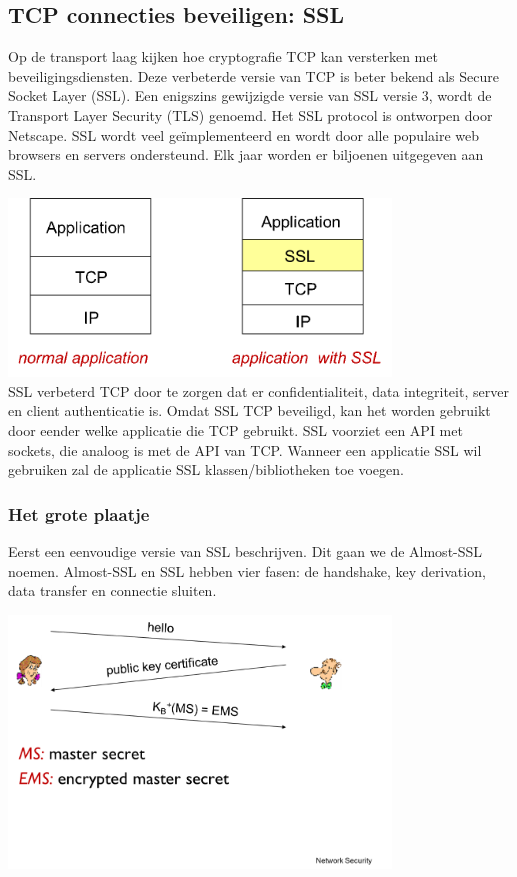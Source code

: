 \subsection{TCP connecties beveiligen: SSL}

Op de transport laag kijken hoe cryptografie TCP kan versterken met beveiligingsdiensten. Deze verbeterde versie van TCP is beter bekend als Secure Socket Layer (SSL). Een enigszins gewijzigde versie van SSL versie 3, wordt de Transport Layer Security (TLS) genoemd.
Het SSL protocol is ontworpen door Netscape. SSL wordt veel geïmplementeerd en wordt door alle populaire web browsers en servers ondersteund. Elk jaar worden er biljoenen uitgegeven aan SSL.

\includegraphics[width=4in]{./img/imghfdst8/hfdst8puntje27.png}\\[1cm]
 

SSL verbeterd TCP door te zorgen dat er confidentialiteit, data integriteit, server en client authenticatie is. Omdat SSL TCP beveiligd, kan het worden gebruikt door eender welke applicatie die TCP gebruikt. SSL voorziet een API met sockets, die analoog is met de API van TCP. Wanneer een applicatie SSL wil gebruiken zal de applicatie SSL klassen/bibliotheken toe voegen.

\subsubsection{Het grote plaatje}

Eerst een eenvoudige versie van SSL beschrijven. Dit gaan we de Almost-SSL noemen. Almost-SSL en SSL hebben vier fasen: de handshake, key derivation, data transfer en connectie sluiten.


\includegraphics[width=4in]{./img/imghfdst8/hfdst8puntje28.png}\\[1cm]

